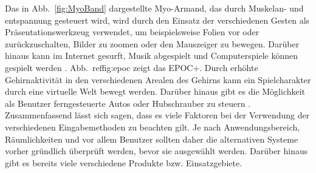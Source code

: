 \newline \newline
Das in Abb.~\ref{fig:MyoBand} dargestellte Myo-Armand, das durch Muskelan- und entspannung gesteuert wird, wird durch den Einsatz der verschiedenen Gesten als Präsentationswerkzeug verwendet, um beispielsweise Folien vor oder zurückzuschalten, Bilder zu zoomen oder den Mauszeiger zu bewegen. Darüber hinaus kann im Internet gesurft, Musik abgespielt und Computerspiele können gespielt werden \cite{myoBand}.
\newline \newline
Abb.~ref{fig:epoc} zeigt das EPOC+. Durch erhöhte Gehirnaktivität in den verschiedenen Arealen des Gehirns kann ein Spielcharakter durch eine virtuelle Welt bewegt werden. Darüber hinaus gibt es die Möglichkeit als Benutzer ferngesteuerte Autos oder Hubschrauber zu steuern \cite{epoc}.
\newline \newline \newline
Zusammenfassend lässt sich sagen, dass es viele Faktoren bei der Verwendung der verschiedenen Eingabemethoden zu beachten gilt. Je nach Anwendungsbereich, Räumlichkeiten und vor allem Benutzer sollten daher die alternativen Systeme vorher gründlich überprüft werden, bevor sie ausgewählt werden. Darüber hinaus gibt es  bereits viele verschiedene Produkte bzw. Einsatzgebiete.
